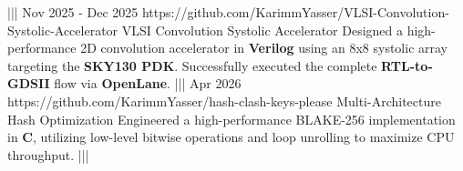 {    |||
    {Nov 2025 - Dec 2025}%
    {https://github.com/KarimmYasser/VLSI-Convolution-Systolic-Accelerator}%
    {VLSI Convolution Systolic Accelerator}%
    {Designed a high-performance 2D convolution accelerator in \textbf{Verilog} using an 8x8 systolic array targeting the \textbf{SKY130 PDK}. Successfully executed the complete \textbf{RTL-to-GDSII} flow via \textbf{OpenLane}.}%
    |||
    {Apr 2026}%
    {https://github.com/KarimmYasser/hash-clash-keys-please}%
    {Multi-Architecture Hash Optimization}%
    {Engineered a high-performance BLAKE-256 implementation in \textbf{C}, utilizing low-level bitwise operations and loop unrolling to maximize CPU throughput.}%
    |||%
}

\newcommand{\programmingLanguages}{C, C++, Rust, Assembly (MIPS, AVR), Python, VHDL, Verilog}
\newcommand{\mobileDevelopment}{}
\newcommand{\frameworksLibraries}{POSIX API, OpenGL, Rayon, PyO3}
\newcommand{\backendDatabase}{}
\newcommand{\developmentTools}{GDB, Valgrind, Make, CMake, Git, Linux/Unix, Bash}
\newcommand{\softwareEngineering}{Memory Management, Process IPC, Multithreading, Concurrency, Hardware-Software Interface}
\newcommand{\dataScience}{}
\newcommand{\artificialIntelligence}{}
\newcommand{\researchSkills}{}
\newcommand{\specializedSkills}{Operating Systems, Embedded C (Bare-Metal, Register-Level), Computer Architecture, Microprocessors}

\newcommand{\problemSolving}{Memory leak debugging, Concurrency issue resolution, System-level bottleneck optimization}
\newcommand{\leadership}{Technical code review, Low-level architecture planning}
\newcommand{\communication}{System documentation, Low-level concept explanation}
\newcommand{\continuousLearning}{Modern C++ adoption, Rust systems programming, Advanced OS design}

